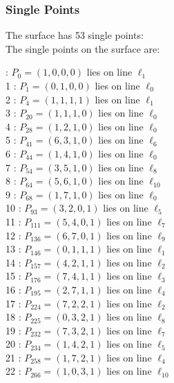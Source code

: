 \documentclass{article}
\begin{document}
{\subsubsection*{Single Points}
The surface has 53 single points:\\
The single points on the surface are:\\
\begin{multicols}{2}
 : $P_{0}=( 1, 0, 0, 0 )$ lies on line $\ell_{1}$\\
1 : $P_{1}=( 0, 1, 0, 0 )$ lies on line $\ell_{0}$\\
2 : $P_{4}=( 1, 1, 1, 1 )$ lies on line $\ell_{1}$\\
3 : $P_{20}=( 1, 1, 1, 0 )$ lies on line $\ell_{0}$\\
4 : $P_{28}=( 1, 2, 1, 0 )$ lies on line $\ell_{0}$\\
5 : $P_{41}=( 6, 3, 1, 0 )$ lies on line $\ell_{6}$\\
6 : $P_{44}=( 1, 4, 1, 0 )$ lies on line $\ell_{0}$\\
7 : $P_{54}=( 3, 5, 1, 0 )$ lies on line $\ell_{8}$\\
8 : $P_{64}=( 5, 6, 1, 0 )$ lies on line $\ell_{10}$\\
9 : $P_{68}=( 1, 7, 1, 0 )$ lies on line $\ell_{0}$\\
10 : $P_{93}=( 3, 2, 0, 1 )$ lies on line $\ell_{5}$\\
11 : $P_{111}=( 5, 4, 0, 1 )$ lies on line $\ell_{7}$\\
12 : $P_{136}=( 6, 7, 0, 1 )$ lies on line $\ell_{9}$\\
13 : $P_{146}=( 0, 1, 1, 1 )$ lies on line $\ell_{1}$\\
14 : $P_{157}=( 4, 2, 1, 1 )$ lies on line $\ell_{2}$\\
15 : $P_{176}=( 7, 4, 1, 1 )$ lies on line $\ell_{3}$\\
16 : $P_{195}=( 2, 7, 1, 1 )$ lies on line $\ell_{4}$\\
17 : $P_{224}=( 7, 2, 2, 1 )$ lies on line $\ell_{2}$\\
18 : $P_{225}=( 0, 3, 2, 1 )$ lies on line $\ell_{8}$\\
19 : $P_{232}=( 7, 3, 2, 1 )$ lies on line $\ell_{7}$\\
20 : $P_{234}=( 1, 4, 2, 1 )$ lies on line $\ell_{5}$\\
21 : $P_{258}=( 1, 7, 2, 1 )$ lies on line $\ell_{4}$\\
22 : $P_{266}=( 1, 0, 3, 1 )$ lies on line $\ell_{10}$\\

\end{multicols}}
\end{document}

